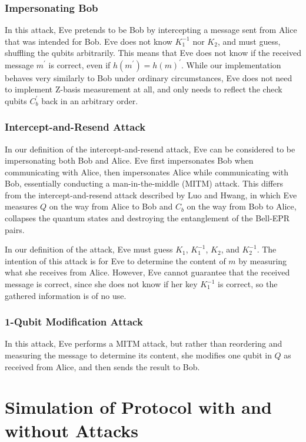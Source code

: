 \documentclass[conference,compsoc]{IEEEtran}
\begin{document}
\subsubsection{Impersonating Bob}

In this attack, Eve pretends to be Bob by intercepting a message sent from Alice that was
intended for Bob. Eve does not know $K_{1}^{-1}$ nor $K_{2}$, and must guess, shuffling the
qubits arbitrarily. This means that Eve does not know if the received message $m^{\prime}$ is correct, even
if $h(m^{\prime}) = h(m)^{\prime}$. While our implementation behaves very similarly to Bob
under ordinary circumstances, Eve does not need to implement Z-basis measurement at all, and only needs
to reflect the check qubits $C_{b}^{\prime}$ back in an arbitrary order.

\subsubsection{Intercept-and-Resend Attack}

In our definition of the intercept-and-resend attack, Eve can be considered to
be impersonating both Bob and Alice. 
Eve first impersonates Bob when communicating with Alice, then impersonates
Alice while communicating with Bob, essentially conducting a man-in-the-middle (MITM) attack.
This differs from the intercept-and-resend attack described by Luo and Hwang, in which Eve measures $Q$
on the way from Alice to Bob and $C_{b}$ on the way from Bob to Alice, collapses the quantum
states and destroying the entanglement of the Bell-EPR pairs.

In our definition of the attack, Eve must guess $K_{1}$, $K_{1}^{-1}$, $K_{2}$, and $K_{2}^{-1}$.
The intention of this attack is for Eve to determine the content of $m$ by measuring what
she receives from Alice. However, Eve cannot guarantee that the received message is correct, since
she does not know if her key $K_{1}^{-1}$ is correct, so the gathered information is of no use.

\subsubsection{1-Qubit Modification Attack}

In this attack, Eve performs a MITM attack, but
rather than reordering and measuring the message to determine its content,
she modifies one qubit in $Q$ as received from Alice, and then sends the result to Bob.

\section{Simulation of Protocol with and without Attacks}
\end{document}
